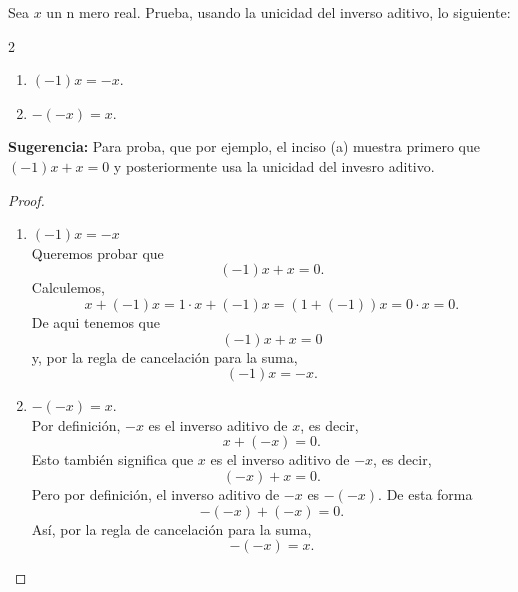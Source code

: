 \documentclass[12pt,a4paper]{article}
\begin{document}
    \begin{problema}
        Sea $x$ un n mero real. Prueba, usando la unicidad del inverso aditivo,
        lo siguiente:
        \begin{multicols}{2}
            \begin{enumerate}
                \item[(a)] $\left(-1\right)x=-x.$
                \item[(b)] $-\left(-x\right)=x.$
            \end{enumerate}
        \end{multicols}
        \textbf{Sugerencia:} Para proba, que por ejemplo, el inciso (a) muestra primero que $(-1)x+x=0$ y posteriormente usa la unicidad del invesro aditivo.
    \end{problema}

    \begin{proof}
        \begin{enumerate}
            \item[(a)] $(-1)x=-x$\\
            Queremos probar que
            \begin{equation*}
                (-1)x+x=0.
            \end{equation*}
            Calculemos,
            \begin{equation*}
                x+(-1)x=1\cdot x+(-1)x=(1+(-1))x=0\cdot x=0. 
            \end{equation*}
            De aqui tenemos que
            \begin{equation*}
                (-1)x+x=0
            \end{equation*}
            y, por la regla de cancelación para la suma,
            \begin{equation*}
                (-1)x=-x.
            \end{equation*}
            \item[(b)] $-(-x)=x$.\\
            Por definición, $-x$ es el inverso aditivo de $x$, es decir,
            \begin{equation*}
                x+(-x)=0.
            \end{equation*}
            Esto también significa que $x$ es el inverso aditivo de $-x$, es decir,
            \begin{equation*}
                (-x)+x=0.
            \end{equation*}
            Pero por definición, el inverso aditivo de $-x$ es $-(-x)$. De esta forma
            \begin{equation*}
                -(-x)+(-x)=0.
            \end{equation*}
            Así, por la regla de cancelación para la suma,
            \begin{equation*}
                -(-x)=x.
            \end{equation*}
        \end{enumerate}
    \end{proof}
\end{document}
